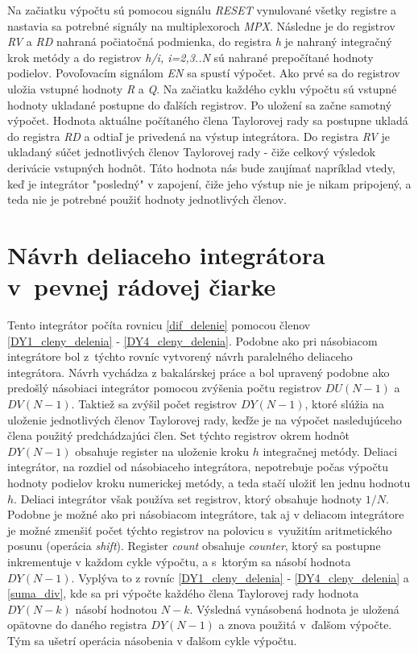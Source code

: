Na začiatku výpočtu sú pomocou signálu \textit{RESET} vynulované všetky registre a nastavia sa potrebné signály na multiplexoroch \textit{MPX}. Následne je do registrov \textit{RV} a \textit{RD} nahraná počiatočná podmienka, do registra \textit{h} je nahraný integračný krok metódy a do registrov \textit{h/i, i=2,3..N} sú nahrané prepočítané hodnoty podielov. Povoľovacím signálom \textit{EN} sa spustí výpočet. Ako prvé sa do registrov uložia vstupné hodnoty \textit{R} a \textit{Q}. Na začiatku každého cyklu výpočtu sú vstupné hodnoty ukladané postupne do ďalších registrov. Po uložení sa začne samotný výpočet. Hodnota aktuálne počítaného člena Taylorovej rady sa postupne ukladá do registra \textit{RD} a odtiaľ je privedená na výstup integrátora.
Do registra \textit{RV} je ukladaný súčet jednotlivých členov Taylorovej rady - čiže celkový výsledok derivácie vstupných hodnôt. Táto hodnota nás bude zaujímať napríklad vtedy, keď je integrátor "posledný" v zapojení, čiže jeho výstup nie je nikam pripojený, a teda nie je potrebné použiť hodnoty jednotlivých členov.


\section{Návrh deliaceho integrátora v~pevnej rádovej čiarke}
Tento integrátor počíta rovnicu \eqref{dif_delenie} pomocou členov \eqref{DY1_cleny_delenia} - \eqref{DY4_cleny_delenia}. Podobne ako pri násobiacom integrátore bol z~týchto rovníc vytvorený návrh paralelného deliaceho integrátora. Návrh vychádza z bakalárskej práce \cite{MatecnyBP} a bol upravený podobne ako predošlý násobiaci integrátor pomocou zvýšenia počtu registrov $ DU(N-1) $ a $ DV(N-1) $. Taktiež sa zvýšil počet registrov $ DY(N-1) $, ktoré slúžia na uloženie jednotlivých členov Taylorovej rady, keďže je na výpočet nasledujúceho člena použitý predchádzajúci člen. Set týchto registrov okrem hodnôt $ DY(N-1) $ obsahuje register na uloženie kroku $ h $ integračnej metódy. Deliaci integrátor, na rozdiel od násobiaceho integrátora, nepotrebuje počas výpočtu hodnoty podielov kroku numerickej metódy, a teda stačí uložiť len jednu hodnotu $ h $. Deliaci integrátor však používa set registrov, ktorý obsahuje hodnoty $ 1/N $. Podobne je možné ako pri násobiacom integrátore, tak aj v deliacom integrátore je možné zmenšiť počet týchto registrov na polovicu s~využitím aritmetického posunu (operácia \textit{shift}). Register \textit{count} obsahuje \textit{counter}, ktorý sa postupne inkrementuje v každom cykle výpočtu, a s~ktorým sa násobí hodnota $ DY(N-1) $. Vyplýva to z rovníc \eqref{DY1_cleny_delenia} - \eqref{DY4_cleny_delenia} a \eqref{suma_div}, kde sa pri výpočte každého člena Taylorovej rady hodnota $ DY(N - k) $ násobí hodnotou $ N - k $. Výsledná vynásobená hodnota je uložená opätovne do daného registra $ DY(N-1) $ a znova použitá v~ďalšom výpočte. Tým sa ušetrí operácia násobenia v ďalšom cykle výpočtu.

